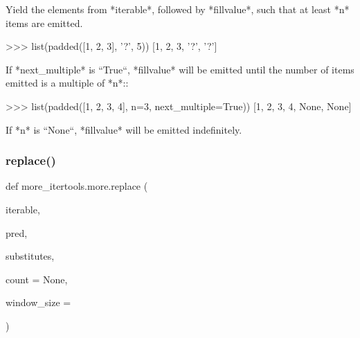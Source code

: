 \begin{DoxyVerb}Yield the elements from *iterable*, followed by *fillvalue*, such that
at least *n* items are emitted.

    >>> list(padded([1, 2, 3], '?', 5))
    [1, 2, 3, '?', '?']

If *next_multiple* is ``True``, *fillvalue* will be emitted until the
number of items emitted is a multiple of *n*::

    >>> list(padded([1, 2, 3, 4], n=3, next_multiple=True))
    [1, 2, 3, 4, None, None]

If *n* is ``None``, *fillvalue* will be emitted indefinitely.\end{DoxyVerb}
 \mbox{\label{namespacemore__itertools_1_1more_a808464682049f7e501e04723780b1208}} 
\subsubsection{\texorpdfstring{replace()}{replace()}}
{\footnotesize\ttfamily def more\+\_\+itertools.\+more.\+replace (\begin{DoxyParamCaption}\item[{}]{iterable,  }\item[{}]{pred,  }\item[{}]{substitutes,  }\item[{}]{count = {\ttfamily None},  }\item[{}]{window\+\_\+size = {} }\end{DoxyParamCaption})}

